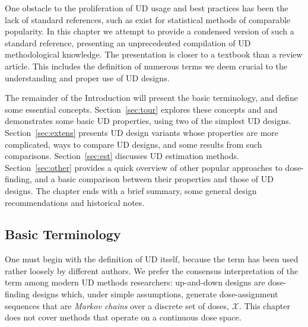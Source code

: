 One obstacle to the proliferation of UD usage and best practices has been the lack of standard references, such as exist for statistical methods of comparable popularity.  In this chapter we attempt to provide a condensed version of such a standard reference, presenting an unprecedented compilation of UD methodological knowledge. The presentation is closer to a textbook than a review article. This includes the definition of numerous terms we deem crucial to the understanding and proper use of UD designs.


The remainder of the Introduction will present the basic terminology, and define some essential concepts. Section~\ref{sec:tour} explores these concepts and and demonstrates some basic UD properties, using two of the simplest UD designs. Section~\ref{sec:extens} presents UD design variants whose properties are more complicated, ways to compare UD designs, and some results from such comparisons. Section~\ref{sec:est} discusses UD estimation methods. Section~\ref{sec:other} provides a quick overview of other popular approaches to dose-finding, and a basic comparison between their properties and those of UD designs. The chapter ends with a brief summary, some general design recommendations and historical notes.

\subsection{Basic Terminology}\label{sec:terminol}

One must begin with the definition of UD itself, because the term has been used rather loosely by different authors. We prefer the consensus interpretation of the term among modern UD methods researchers: up-and-down designs are dose-finding designs which, under simple assumptions, generate dose-assignment sequences that are \emph{Markov chains} over a discrete set of doses, $\mathcal{X}$. This chapter does not cover methods that operate on a continuous dose space.

